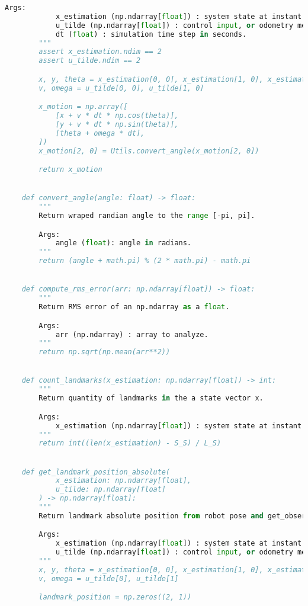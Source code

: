 \documentclass[../CSC_5RO12_TA_TP4.tex]{subfiles}
\begin{document}
\begin{scriptsize}
\begin{lstlisting}[language=Python]
        Args:
            x_estimation (np.ndarray[float]) : system state at instant k.
            u_tilde (np.ndarray[float]) : control input, or odometry measurement, at instant k.
            dt (float) : simulation time step in seconds.
        """
        assert x_estimation.ndim == 2
        assert u_tilde.ndim == 2

        x, y, theta = x_estimation[0, 0], x_estimation[1, 0], x_estimation[2, 0]
        v, omega = u_tilde[0, 0], u_tilde[1, 0]

        x_motion = np.array([
            [x + v * dt * np.cos(theta)],
            [y + v * dt * np.sin(theta)],
            [theta + omega * dt],
        ])
        x_motion[2, 0] = Utils.convert_angle(x_motion[2, 0])

        return x_motion


    def convert_angle(angle: float) -> float:
        """
        Return wraped randian angle to the range [-pi, pi].

        Args:
            angle (float): angle in radians.
        """
        return (angle + math.pi) % (2 * math.pi) - math.pi


    def compute_rms_error(arr: np.ndarray[float]) -> float:
        """
        Return RMS error of an np.ndarray as a float.

        Args:
            arr (np.ndarray) : array to analyze.
        """
        return np.sqrt(np.mean(arr**2))


    def count_landmarks(x_estimation: np.ndarray[float]) -> int:
        """
        Return quantity of landmarks in the a state vector x.

        Args: 
            x_estimation (np.ndarray[float]) : system state at instant k.
        """
        return int((len(x_estimation) - S_S) / L_S)


    def get_landmark_position_absolute(
            x_estimation: np.ndarray[float],
            u_tilde: np.ndarray[float]
        ) -> np.ndarray[float]:
        """
        Return landmark absolute position from robot pose and get_observation.

        Args:
            x_estimation (np.ndarray[float]) : system state at instant k.
            u_tilde (np.ndarray[float]) : control input, or odometry measurement, at instant k.
        """
        x, y, theta = x_estimation[0, 0], x_estimation[1, 0], x_estimation[2, 0]
        v, omega = u_tilde[0], u_tilde[1]

        landmark_position = np.zeros((2, 1))


\end{lstlisting}
\end{scriptsize}
\end{document}

